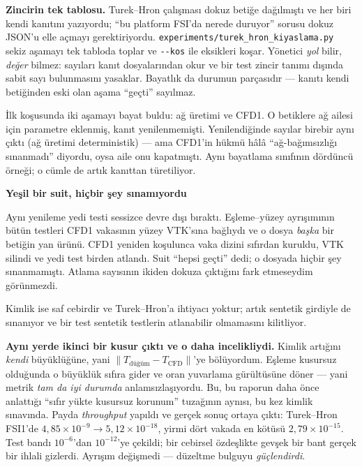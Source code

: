 \documentclass[11pt,a4paper]{article}
\newcommand{\kkkenar}{lacivert}
\newcommand{\kkzemin}{kod}
\newenvironment{renkkutu}[3]{%
  \renewcommand{\kkkenar}{#1}\renewcommand{\kkzemin}{#2}%
  \par\medskip\noindent
  \begin{lrbox}{\kutugovde}%
  \begin{minipage}{\dimexpr\linewidth-2\fboxsep-2\fboxrule\relax}\footnotesize
  \textcolor{#1}{\textbf{#3}}\par\vspace{3pt}%
}{%
  \end{minipage}%
  \end{lrbox}%
  \noindent\fcolorbox{\kkkenar}{\kkzemin}{\usebox{\kutugovde}}%
  \par\medskip
}
\newenvironment{dikkat}[1]{\begin{renkkutu}{orta}{ortabg}{#1}}{\end{renkkutu}}
\begin{document}
\begin{description}
        \medskip
        \noindent \textbf{Zincirin tek tablosu.} Turek--Hron çalışması
        dokuz betiğe dağılmıştı ve her biri kendi kanıtını yazıyordu;
        ``bu platform FSI'da nerede duruyor'' sorusu dokuz JSON'u elle
        açmayı gerektiriyordu. \texttt{experiments/turek\_hron\_kiyaslama.py}
        sekiz aşamayı tek tabloda toplar ve \texttt{-{}-kos} ile eksikleri
        koşar. Yönetici \emph{yol} bilir, \emph{değer} bilmez: sayıları
        kanıt dosyalarından okur ve bir test zincir tanımı dışında sabit
        sayı bulunmasını yasaklar. Bayatlık da durumun parçasıdır ---
        kanıtı kendi betiğinden eski olan aşama ``geçti'' sayılmaz.

        \noindent İlk koşusunda iki aşamayı bayat buldu: ağ üretimi ve
        CFD1. O betiklere ağ ailesi için parametre eklenmiş, kanıt
        yenilenmemişti. Yenilendiğinde sayılar birebir aynı çıktı (ağ
        üretimi deterministik) --- ama CFD1'in hükmü hâlâ ``ağ-bağımsızlığı
        sınanmadı'' diyordu, oysa aile onu kapatmıştı. Aynı bayatlama
        sınıfının dördüncü örneği; o cümle de artık kanıttan türetiliyor.

        \begin{dikkat}{Yeşil bir suit, hiçbir şey sınamıyordu}
        Aynı yenileme yedi testi sessizce devre dışı bıraktı. Eşleme--yüzey
        ayrışımının bütün testleri CFD1 vakasının yüzey VTK'sına bağlıydı
        ve o dosya \emph{başka} bir betiğin yan ürünü. CFD1 yeniden
        koşulunca vaka dizini sıfırdan kuruldu, VTK silindi ve yedi test
        birden atlandı. Suit ``hepsi geçti'' dedi; o dosyada hiçbir şey
        sınanmamıştı. Atlama sayısının ikiden dokuza çıktığını fark
        etmeseydim görünmezdi.

        Kimlik ise saf cebirdir ve Turek--Hron'a ihtiyacı yoktur; artık
        sentetik girdiyle de sınanıyor ve bir test sentetik testlerin
        atlanabilir olmamasını kilitliyor.

        \textbf{Aynı yerde ikinci bir kusur çıktı ve o daha incelikliydi.}
        Kimlik artığını \emph{kendi} büyüklüğüne, yani
        $\|T_{\text{düğüm}} - T_{\text{CFD}}\|$'ye bölüyordum. Eşleme
        kusursuz olduğunda o büyüklük sıfıra gider ve oran yuvarlama
        gürültüsüne döner --- yani metrik \emph{tam da iyi durumda}
        anlamsızlaşıyordu. Bu, bu raporun daha önce anlattığı ``sıfır yükte
        kusursuz korunum'' tuzağının aynısı, bu kez kimlik sınavında.
        Payda \emph{throughput} yapıldı ve gerçek sonuç ortaya çıktı:
        Turek--Hron FSI1'de $4{,}85\times10^{-9} \to 5{,}12\times10^{-18}$,
        yirmi dört vakada en kötüsü $2{,}79\times10^{-15}$. Test bandı
        $10^{-6}$'dan $10^{-12}$'ye çekildi; bir cebirsel özdeşlikte gevşek
        bir bant gerçek bir ihlali gizlerdi. Ayrışım değişmedi --- düzeltme
        bulguyu \emph{güçlendirdi}.
        \end{dikkat}


\end{description}
\end{document}
